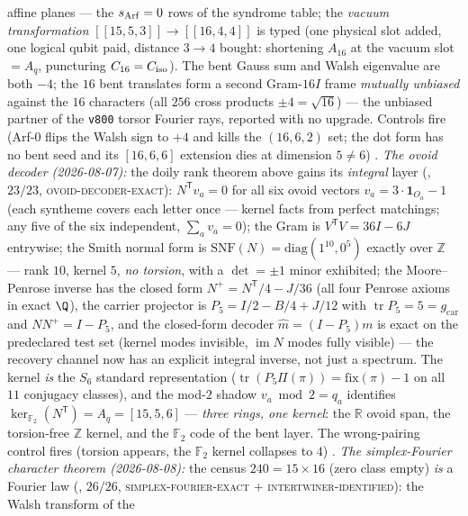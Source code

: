 \documentclass[11pt,a4paper]{article}
\newcommand{\gcar}{g_{\mathrm{car}}}
\newcommand{\Z}{\mathbb{Z}}
\theoremstyle{definition}
\begin{document}
\begin{keybox}
affine planes --- the $s_{\rm Arf} = 0$ rows of the syndrome
table; the \emph{vacuum transformation} $[[15,5,3]] \to
[[16,4,4]]$ is typed (one physical slot added, one logical qubit
paid, distance $3 \to 4$ bought: shortening $A_{16}$ at the
vacuum slot $= A_q$, puncturing $C_{16} = C_{\rm iso}$).
The bent Gauss sum and Walsh eigenvalue are both $-4$; the $16$ bent
translates form a second Gram-$16I$ frame \emph{mutually
unbiased} against the $16$ characters (all $256$ cross products
$\pm4 = \sqrt{16}$) --- the unbiased partner of the \texttt{v800}
torsor Fourier rays, reported with no upgrade.  Controls fire
(Arf-$0$ flips the Walsh sign to $+4$ and kills the $(16,6,2)$
set; the dot form has no bent seed and its $[16,6,6]$ extension
dies at dimension $5 \ne 6$) \mE.
\emph{The ovoid decoder (2026-08-07):} the doily rank theorem
above gains its \emph{integral} layer
(, $23/23$,
\textsc{ovoid-decoder-exact}): $N^{\mathsf T}v_a = 0$ for all six
ovoid vectors $v_a = 3\cdot\mathbf 1_{O_a} - 1$ (each syntheme
covers each letter once --- kernel facts from perfect matchings;
any five of the six independent, $\sum_a v_a = 0$); the Gram is
$V^{\mathsf T}V = 36I - 6J$ entrywise; the Smith normal form is
$\mathrm{SNF}(N) = \mathrm{diag}(1^{10}, 0^5)$ exactly over $\Z$
--- rank $10$, kernel $5$, \emph{no torsion}, with a
$\det = \pm1$ minor exhibited; the Moore--Penrose inverse has the
closed form $N^{+} = N^{\mathsf T}/4 - J/36$ (all four Penrose
axioms in exact $\Q$), the carrier projector is $P_5 = I/2 - B/4
+ J/12$ with $\operatorname{tr} P_5 = 5 = \gcar$ and $NN^{+} =
I - P_5$, and the closed-form decoder $\hat m = (I - P_5)m$ is
exact on the predeclared test set (kernel modes invisible,
$\operatorname{im} N$ modes fully visible) --- the recovery
channel now has an explicit integral inverse, not just a
spectrum.  The kernel \emph{is} the $S_6$ standard
representation ($\operatorname{tr}(P_5\Pi(\pi)) =
\mathrm{fix}(\pi) - 1$ on all $11$ conjugacy classes), and the
mod-$2$ shadow $v_a \bmod 2 = q_a$ identifies
$\ker_{\mathbb{F}_2}(N^{\mathsf T}) = A_q = [15,5,6]$ --- \emph{three
rings, one kernel}: the $\mathbb{R}$ ovoid span, the torsion-free $\Z$
kernel, and the $\mathbb{F}_2$ code of the bent layer.  The wrong-pairing
control fires (torsion appears, the $\mathbb{F}_2$ kernel collapses to
$4$) \mE.
\emph{The simplex-Fourier character theorem (2026-08-08):} the
census $240 = 15 \times 16$ (zero class empty) \emph{is} a
Fourier law
(, $26/26$,
\textsc{simplex-fourier-exact} $+$
\textsc{intertwiner-identified}): the Walsh transform of the

\end{keybox}
\end{document}
